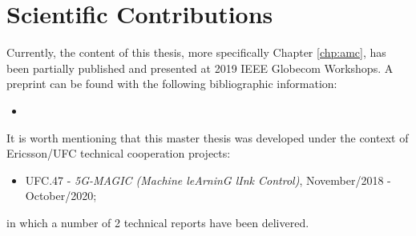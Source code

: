 \section{Scientific Contributions}
\begin{refsection}

Currently, the content of this thesis, more specifically Chapter \ref{chp:amc}, has been partially published and presented at 2019 IEEE Globecom Workshops.
%
A preprint can be found with the following bibliographic information:
%
\begin{itemize}
	\item {}
\end{itemize}

It is worth mentioning that this master thesis was developed under the context of Ericsson/UFC technical cooperation projects:
\begin{itemize}
	\item UFC.47 - \textit{5G-MAGIC (Machine leArninG lInk Control)}, November/2018 - October/2020;
\end{itemize}

in which a number of 2 technical reports have been delivered. %

\end{refsection}
